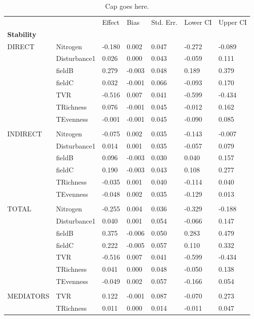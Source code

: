 \begin{longtable}[c]{l l l l l l l }
\caption{Cap goes here. \label{tbl:table-name}}\\
 & & Effect & Bias & Std.  Err. & Lower  CI & Upper  CI\\
\textbf{Stability} &  &  &  &  &  &\\
\hline
 DIRECT & Nitrogen & -0.180 & 0.002 & 0.047 & -0.272 & -0.089\\
 & Disturbance1 & 0.026 & 0.000 & 0.043 & -0.059 & 0.111\\
 & fieldB & 0.279 & -0.003 & 0.048 & 0.189 & 0.379\\
 & fieldC & 0.032 & -0.001 & 0.066 & -0.093 & 0.170\\
 & TVR & -0.516 & 0.007 & 0.041 & -0.599 & -0.434\\
 & TRichness & 0.076 & -0.001 & 0.045 & -0.012 & 0.162\\
 & TEvenness & -0.001 & -0.001 & 0.045 & -0.090 & 0.085\\
 & & & & & & \\
 INDIRECT & Nitrogen & -0.075 & 0.002 & 0.035 & -0.143 & -0.007\\
 & Disturbance1 & 0.014 & 0.001 & 0.035 & -0.057 & 0.079\\
 & fieldB & 0.096 & -0.003 & 0.030 & 0.040 & 0.157\\
 & fieldC & 0.190 & -0.003 & 0.043 & 0.108 & 0.277\\
 & TRichness & -0.035 & 0.001 & 0.040 & -0.114 & 0.040\\
 & TEvenness & -0.048 & 0.002 & 0.035 & -0.129 & 0.013\\
 & & & & & & \\
 TOTAL & Nitrogen & -0.255 & 0.004 & 0.036 & -0.329 & -0.188\\
 & Disturbance1 & 0.040 & 0.001 & 0.054 & -0.066 & 0.147\\
 & fieldB & 0.375 & -0.006 & 0.050 & 0.283 & 0.479\\
 & fieldC & 0.222 & -0.005 & 0.057 & 0.110 & 0.332\\
 & TVR & -0.516 & 0.007 & 0.041 & -0.599 & -0.434\\
 & TRichness & 0.041 & 0.000 & 0.048 & -0.050 & 0.138\\
 & TEvenness & -0.049 & 0.002 & 0.057 & -0.166 & 0.054\\
 & & & & & & \\
 MEDIATORS &TVR & 0.122 & -0.001 & 0.087 & -0.070 & 0.273\\
 & TRichness & 0.011 & 0.000 & 0.014 & -0.011 & 0.047\\

\end{longtable}
